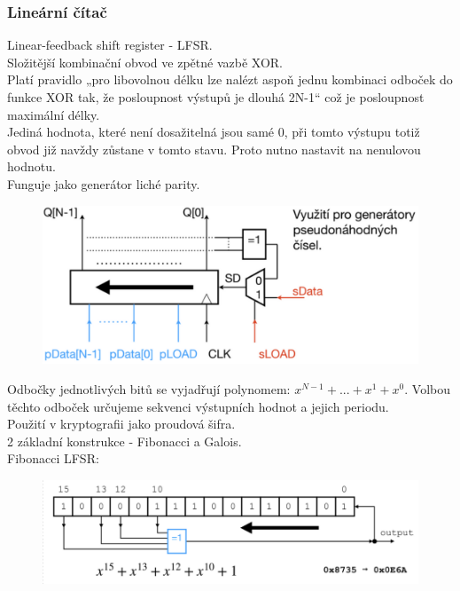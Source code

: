 \subsubsection{Lineární čítač}
Linear-feedback shift register - LFSR.\\
Složitější kombinační obvod ve zpětné vazbě XOR.\\
Platí pravidlo „pro libovolnou délku lze nalézt aspoň jednu kombinaci odboček do funkce XOR tak, že posloupnost výstupů je dlouhá 2N-1“ což je posloupnost maximální délky.\\
Jediná hodnota, které není dosažitelná jsou samé 0, při tomto výstupu totiž obvod již navždy zůstane v tomto stavu. Proto nutno nastavit na nenulovou hodnotu.\\
Funguje jako generátor liché parity.\\
\begin{figure}[h!]
    \centering
    \includegraphics[scale = 0.4]{img/LSFR.png}
\end{figure}
\newpage
Odbočky jednotlivých bitů se vyjadřují polynomem: \(x^{N-1}+...+x^1+x^0\). Volbou těchto odboček určujeme sekvenci výstupních hodnot a jejich periodu.\\
Použití v kryptografii jako proudová šifra. \\
2 základní konstrukce - Fibonacci a Galois.\\
Fibonacci LFSR: \\
\begin{figure}[h!]
    \centering
    \includegraphics*[scale = 0.4]{img/Fibonacii.png}
\end{figure}

